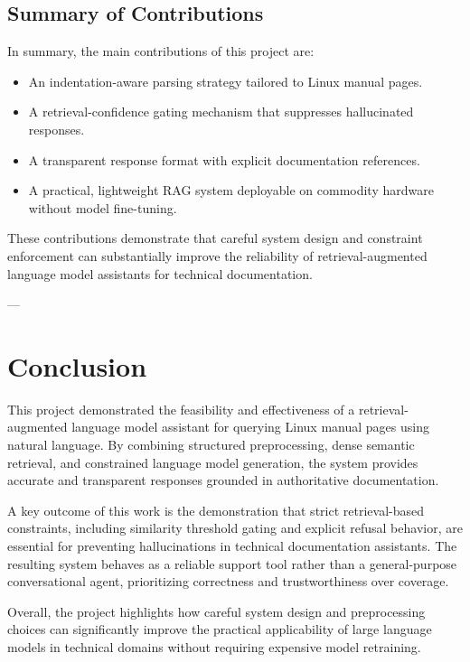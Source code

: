 \documentclass[conference]{IEEEtran}
\begin{document}
\subsection{Summary of Contributions}

In summary, the main contributions of this project are:
\begin{itemize}
    \item An indentation-aware parsing strategy tailored to Linux manual pages.
    \item A retrieval-confidence gating mechanism that suppresses hallucinated responses.
    \item A transparent response format with explicit documentation references.
    \item A practical, lightweight RAG system deployable on commodity hardware without model fine-tuning.
\end{itemize}

These contributions demonstrate that careful system design and constraint enforcement can substantially improve the reliability of retrieval-augmented language model assistants for technical documentation.

---

\section{Conclusion}

This project demonstrated the feasibility and effectiveness of a retrieval-augmented language model assistant for querying Linux manual pages using natural language. By combining structured preprocessing, dense semantic retrieval, and constrained language model generation, the system provides accurate and transparent responses grounded in authoritative documentation.

A key outcome of this work is the demonstration that strict retrieval-based constraints, including similarity threshold gating and explicit refusal behavior, are essential for preventing hallucinations in technical documentation assistants. The resulting system behaves as a reliable support tool rather than a general-purpose conversational agent, prioritizing correctness and trustworthiness over coverage.

Overall, the project highlights how careful system design and preprocessing choices can significantly improve the practical applicability of large language models in technical domains without requiring expensive model retraining.
\end{document}
